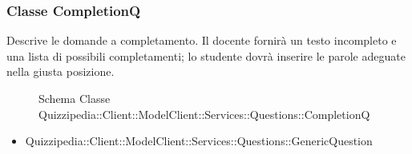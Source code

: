 \subsubsection{Classe CompletionQ}
Descrive le domande a completamento. Il docente fornirà un testo incompleto e una lista di possibili completamenti; lo studente dovrà inserire le parole adeguate nella giusta posizione.
\begin{figure}[H]
\centering
\noindent{}
\caption[Schema Classe CompletionQ]{Schema Classe Quizzipedia::Client::ModelClient::Services::Questions::CompletionQ}
\end{figure}
\begin{itemize}
\item Quizzipedia::Client::ModelClient::Services::Questions::GenericQuestion
\end{itemize}
